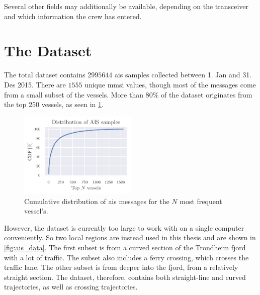 Several other fields may additionally be available, depending on the transceiver and which information the crew has entered. 

\section{The Dataset}
The total dataset contains $2995644$ \acrshort{ais} samples collected between 1. Jan and 31. Des 2015. There are $1555$ unique \acrshort{mmsi} values, though most of the messages come from a small subset of the vessels. More than $80\%$ of the dataset originates from the top $250$ vessels, as seen in \cref{fig:ais_cdf}.

\begin{figure}[h]
    \centering
    \includegraphics[width=0.5\textwidth]{figures/mmsi_cdf.pdf}
    \caption{Cumulative distribution of \acrshort{ais} messages for the $N$ most frequent vessel's.}
    \label{fig:ais_cdf}
\end{figure}

However, the dataset is currently too large to work with on a single computer conveniently. So two local regions are instead used in this thesis and are shown in \cref{fig:ais_data}. The first subset is from a curved section of the Trondheim fjord with a lot of traffic. The subset also includes a ferry crossing, which crosses the traffic lane. The other subset is from deeper into the fjord, from a relatively straight section. The dataset, therefore, contains both straight-line and curved trajectories, as well as crossing trajectories. 


